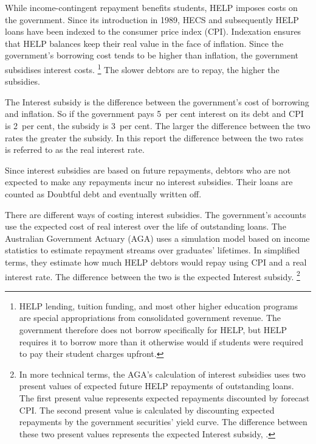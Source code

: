 \documentclass{grattan}
\begin{document}
While income-contingent repayment benefits students, \gls{HELP} imposes costs on the government. 
Since its introduction in 1989, \gls{HECS} and subsequently \gls{HELP} loans have been indexed to the consumer price index (\gls{CPI}\@).
Indexation ensures that \gls{HELP} balances keep their real value in the face of inflation.
Since the government’s borrowing cost tends to be higher than inflation, the government subsidises  interest costs.%
   \footnote{\gls{HELP} lending, tuition funding, and most other higher education programs are special appropriations from consolidated government revenue.
The government therefore does not borrow specifically for \gls{HELP}, but \gls{HELP} requires it to borrow more than it otherwise would if students were required to pay their student charges upfront.} The slower debtors are to repay, the higher the subsidies. 


The \gls{Interest subsidy} is the difference between the government's cost of borrowing and inflation.
So if the government pays 5~per cent interest on its debt and \gls{CPI} is 2~per cent, the subsidy is 3~per cent.
The larger the difference between the two rates the greater the subsidy.
In this report the difference between the two rates is referred to as the real interest rate.


Since interest subsidies are based on future repayments, debtors who are not expected to make any repayments incur no interest subsidies.
Their loans are counted as \gls{Doubtful debt} and eventually written off.

There are different ways of costing interest subsidies.
The government's accounts use the expected cost of real interest over the life of outstanding loans.
The Australian Government Actuary (\gls{AGA}) uses a simulation model based on income statistics to estimate repayment streams over graduates' lifetimes.
In simplified terms, they estimate how much \gls{HELP} debtors would repay using \gls{CPI} and a real interest rate.
The difference between the two is the expected \gls{Interest subsidy}.%
   \footnote{In more technical terms, the \gls{AGA}'s calculation of interest subsidies uses two present values of expected future \gls{HELP} repayments of outstanding loans.
The first present value represents expected repayments discounted by forecast \gls{CPI}\@.
The second present value is calculated by discounting expected repayments by the government securities' yield curve.
The difference between these two present values represents the expected \gls{Interest subsidy},  \textcite[][Appendix~A]{Consulting2013PrivatisationHECSdebt}.}
\end{document}
